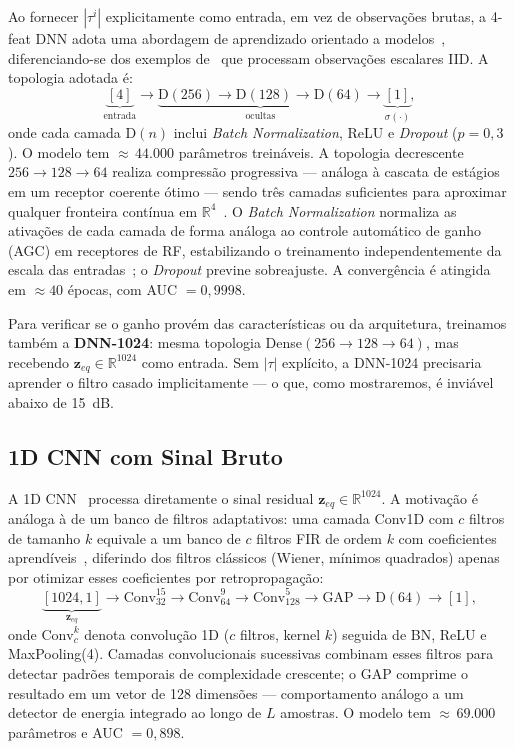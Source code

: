 \documentclass{sbrt}
\begin{document}
Ao fornecer $|\tau^i|$ explicitamente como entrada, em vez de observações brutas, a 4-feat DNN adota uma abordagem de aprendizado orientado a modelos~\cite{ref_shlezinger}, diferenciando-se dos exemplos de~\cite{ref_braca} que processam observações escalares IID. A topologia adotada é:
\begin{equation}\label{eq:arch}
\underbrace{[4]}_{\text{entrada}}\!\to\!\underbrace{\text{D}(256)\!\to\!\text{D}(128)\!\to\!\text{D}(64)}_{\text{ocultas}}\!\to\!\underbrace{[1]}_{\sigma(\cdot)},
\end{equation}
onde cada camada D$(n)$ inclui \textit{Batch Normalization}, ReLU e \textit{Dropout} ($p = 0{,}3$). O modelo tem ${\approx}\,44{.}000$ parâmetros treináveis. A topologia decrescente $256\!\to\!128\!\to\!64$ realiza compressão progressiva — análoga à cascata de estágios em um receptor coerente ótimo — sendo três camadas suficientes para aproximar qualquer fronteira contínua em $\mathbb{R}^4$~\cite{ref_goodfellow}. O \textit{Batch Normalization} normaliza as ativações de cada camada de forma análoga ao controle automático de ganho (AGC) em receptores de RF, estabilizando o treinamento independentemente da escala das entradas~\cite{ref_goodfellow}; o \textit{Dropout} previne sobreajuste. A convergência é atingida em $\approx\!40$ épocas, com AUC $= 0{,}9998$.

Para verificar se o ganho provém das características ou da arquitetura, treinamos também a \textbf{DNN-1024}: mesma topologia Dense$(256\!\to\!128\!\to\!64)$, mas recebendo $\mathbf{z}_{eq} \in \mathbb{R}^{1024}$ como entrada. Sem $|\tau|$ explícito, a DNN-1024 precisaria aprender o filtro casado implicitamente — o que, como mostraremos, é inviável abaixo de 15~dB.

\subsection{1D CNN com Sinal Bruto}\label{sec:cnn1d}

A 1D CNN~\cite{ref_liao,ref_oshea} processa diretamente o sinal residual $\mathbf{z}_{eq} \in \mathbb{R}^{1024}$. A motivação é análoga à de um banco de filtros adaptativos: uma camada Conv1D com $c$ filtros de tamanho $k$ equivale a um banco de $c$ filtros FIR de ordem $k$ com coeficientes aprendíveis~\cite{ref_proakis}, diferindo dos filtros clássicos (Wiener, mínimos quadrados) apenas por otimizar esses coeficientes por retropropagação:
\begin{equation}\label{eq:cnn}
\underbrace{[1024,1]}_{\mathbf{z}_{eq}}\!\to\!\text{Conv}_{32}^{15}\!\to\!\text{Conv}_{64}^{9}\!\to\!\text{Conv}_{128}^{5}\!\to\!\text{GAP}\!\to\!\text{D}(64)\!\to\![1],
\end{equation}
onde $\text{Conv}_{c}^{k}$ denota convolução 1D ($c$ filtros, kernel $k$) seguida de BN, ReLU e MaxPooling(4). Camadas convolucionais sucessivas combinam esses filtros para detectar padrões temporais de complexidade crescente; o GAP comprime o resultado em um vetor de 128 dimensões — comportamento análogo a um detector de energia integrado ao longo de $L$ amostras. O modelo tem ${\approx}\,69{.}000$ parâmetros e AUC $= 0{,}898$.
\end{document}
